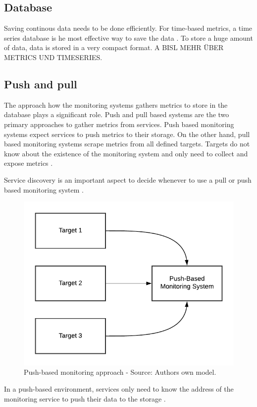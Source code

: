 \subsection{Database}
Saving continous data needs to be done efficiently. 
For time-based metrics, a time series database is he most effective way to save the data \cite{Farcic2017Toolkit21}. To store a huge amount of data, data is stored in a very compact format.
A BISL MEHR ÜBER METRICS UND TIMESERIES.


\subsection{Push and pull}
\label{subsec:02_monitoring_push-pull}
The approach how the monitoring systems gathers metrics to store in the database plays a significant role.
Push and pull based systems are the two primary approaches to gather metrics from services.
Push based monitoring systems expect services to push metrics to their storage.
On the other hand, pull based monitoring systems scrape metrics from all defined targets. Targets do not know about the existence of the monitoring system and only need to collect and expose metrics \cite{Farcic2017Toolkit21}.


Service discovery is an important aspect to decide whenever to use a pull or push based monitoring system \cite{Farcic2017Toolkit21}.

\begin{figure}[h]
\centering
\includegraphics[scale=0.8]{images/02_theoretical_foundation/monitoring/push_based}
\caption{Push-based monitoring approach - Source: Authors own model.}
\label{fig:mon_push-based}
\end{figure}
In a push-based environment, services only need to know the address of the monitoring service to push their data to the storage \cite{Farcic2017Toolkit21}.



